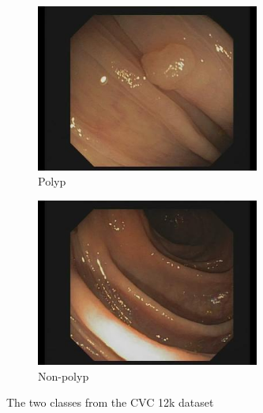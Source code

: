     \begin{figure}
        \centering       
        \begin{subfigure}[b]{0.45\textwidth}   
            \centering 
            \includegraphics[height=5.5cm,width=\textwidth]{methodology/figures/CVC12kpolyp.jpg}
            \caption{{\small Polyp}}    
            \label{fig:CVC12kpolyp}
        \end{subfigure}
        \qquad%
        \begin{subfigure}[b]{0.45\textwidth}   
            \centering 
            \includegraphics[height=5.5cm,width=\textwidth]{methodology/figures/CVC12kNONpolyp.jpg}
            \caption{{\small Non-polyp}}    
            \label{fig:CVC12kNONpolyp}
        \end{subfigure}
        \caption{\small The two classes from the CVC 12k dataset} 
        \label{fig:Kvasir}
    \end{figure}
    

\FloatBarrier
